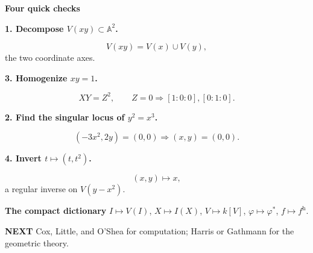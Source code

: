 \documentclass[9pt,a4paper]{extarticle}
\newcommand{\A}{\mathbb{A}}
\newcommand{\kk}{k}
\newcommand{\eyebrow}[1]{{\fontsize{7.2}{8}\selectfont\bfseries\color{teal}\MakeUppercase{#1}}}
\begin{document}
\vspace{6pt}
{\fontsize{13}{15}\selectfont\bfseries\color{navy}Four quick checks}\par\vspace{5pt}
\begin{minipage}[t]{.485\textwidth}
\textbf{1. Decompose $V(xy)\subset\A^2$.}\par
\begin{tealbox}
\[
V(xy)=V(x)\cup V(y),
\]
the two coordinate axes.
\end{tealbox}
\vspace{5pt}
\textbf{3. Homogenize $xy=1$.}\par
\begin{goldbox}
\[
XY=Z^2,\qquad Z=0\Longrightarrow [1:0:0],[0:1:0].
\]
\end{goldbox}
\end{minipage}\hfill
\begin{minipage}[t]{.485\textwidth}
\textbf{2. Find the singular locus of $y^2=x^3$.}\par
\begin{coralbox}
\[
(-3x^2,2y)=(0,0)\Longrightarrow (x,y)=(0,0).
\]
\end{coralbox}
\vspace{5pt}
\textbf{4. Invert $t\mapsto(t,t^2)$.}\par
\begin{mathbox}
\[
(x,y)\longmapsto x,
\]
a regular inverse on $V(y-x^2)$.
\end{mathbox}
\end{minipage}

\vspace{6pt}
\begin{mathbox}
\centering
\textbf{The compact dictionary}\qquad
$I\mapsto V(I)$,
$X\mapsto I(X)$,
$V\mapsto\kk[V]$,
$\varphi\mapsto\varphi^*$,
$f\mapsto f^{\mathrm h}$.
\end{mathbox}

\vfill
\eyebrow{Next}\quad
Cox, Little, and O'Shea for computation; Harris or Gathmann for the geometric theory.
\end{document}
